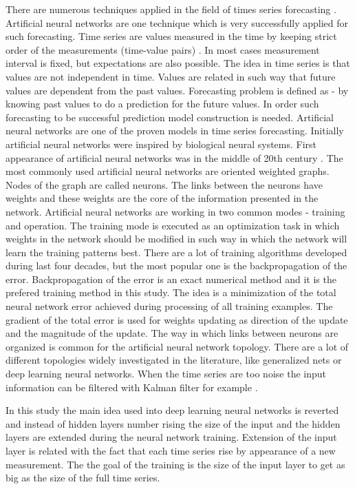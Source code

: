 \documentclass[11pt]{article}
\begin{document}
There are numerous techniques applied in the field of times series forecasting \cite{atanasova01}. Artificial neural networks are one technique which is very successfully applied for such forecasting. Time series are values measured in the time by keeping strict order of the measurements (time-value pairs) \cite{balabanov01}. In most cases measurement interval is fixed, but expectations are also possible. The idea in time series is that values are not independent in time. Values are related in such way that future values are dependent from the past values. Forecasting problem is defined as - by knowing past values to do a prediction for the future values. In order such forecasting to be successful prediction model construction is needed. Artificial neural networks are one of the proven models in time series forecasting. Initially artificial neural networks were inspired by biological neural systems. First appearance of artificial neural networks was in the middle of 20th century \cite{balabanov02}. The most commonly used artificial neural networks are oriented weighted graphs. Nodes of the graph are called neurons. The links between the neurons have weights and these weights are the core of the information presented in the network. Artificial neural networks are working in two common modes - training and operation. The training mode is executed as an optimization task in which weights in the network should be modified in such way in which the network will learn the training patterns best. There are a lot of training algorithms developed during last four decades, but the most popular one is the backpropagation of the error. Backpropagation of the error is an exact numerical method and it is the prefered training method in this study. The idea is a minimization of the total neural network error achieved during processing of all training examples. The gradient of the total error is used for weights updating as direction of the update and the magnitude of the update. The way in which links between neurons are organized is common for the artificial neural network topology. There are a lot of different topologies widely investigated in the literature, like generalized nets \cite{tashev01} or deep learning neural networks. When the time series are too noise the input information can be filtered with Kalman filter for example \cite{alexandrov01}. 

In this study the main idea used into deep learning neural networks is reverted and instead of hidden layers number rising the size of the input and the hidden layers are extended during the neural network training. Extension of the input layer is related with the fact that each time series rise by appearance of a new measurement. The the goal of the training is the size of the input layer to get as big as the size of the full time series. 
\end{document}
